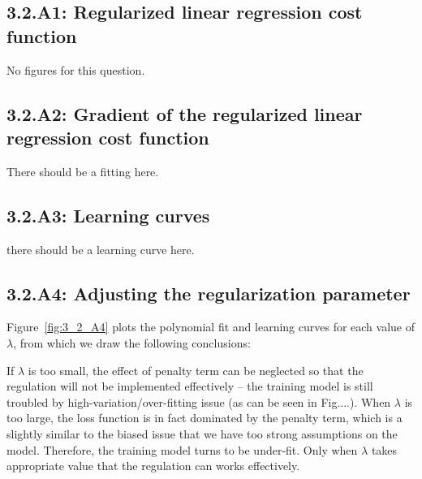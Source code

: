 \documentclass[english,11pt]{article}
\begin{document}
\subsection*{3.2.A1: Regularized linear regression cost function}
No figures for this question.

\subsection*{3.2.A2: Gradient of the regularized linear regression cost function}
There should be a fitting here.

\subsection*{3.2.A3: Learning curves}
there should be a learning curve here.

\subsection*{3.2.A4: Adjusting the regularization parameter}
Figure~\ref{fig:3_2_A4} plots the polynomial fit and learning curves for each  value of $\lambda$, from which we draw the following conclusions:

If $\lambda$ is too small, the effect of penalty term can be neglected so that the regulation will not be implemented effectively -- the training model is still troubled by high-variation/over-fitting issue (as can be seen in Fig....). When $\lambda$ is too large, the loss function is in fact dominated by the penalty term, which is a slightly similar to the biased issue that we have too strong assumptions on the model. Therefore, the training model turns to be under-fit.  Only when $\lambda$ takes appropriate value that the regulation can works effectively.
\end{document}
